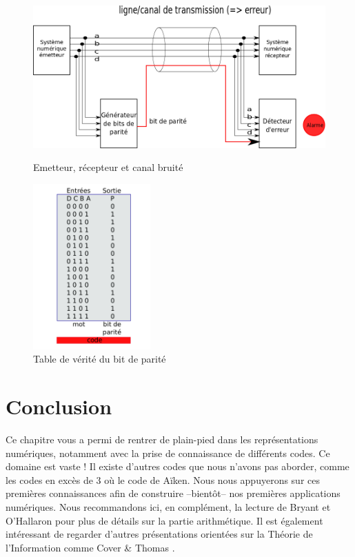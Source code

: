 \begin{figure}[htb!]
    \centering
    \begin{minipage}{0.45\textwidth}
        \centering
        \includegraphics[width=1.1\textwidth]{./figures/parite-1.png} %
        \caption{Emetteur, récepteur et canal bruité}
    \end{minipage}\hfill
    \begin{minipage}{0.45\textwidth}
        \centering
        \includegraphics[width=0.4\textwidth]{./figures/parite-3.png} %
        \caption{Table de vérité du bit de parité}
    \end{minipage}
\end{figure}


\section{Conclusion}
Ce chapitre vous a permi de rentrer de plain-pied dans les représentations numériques,
notamment avec la prise de connaissance de différents codes. Ce domaine est vaste ! Il existe d'autres codes
que nous n'avons pas aborder, comme les codes en excès de 3 où le code de Aïken.
Nous nous appuyerons sur ces premières connaissances afin de construire --bientôt-- nos
premières applications numériques.
Nous recommandons ici, en complément, la lecture de Bryant et O'Hallaron \cite{bryant} pour plus de détails sur la partie arithmétique.
Il est également intéressant de regarder d'autres présentations orientées sur la Théorie de l'Information comme Cover \& Thomas \cite{cover}.
